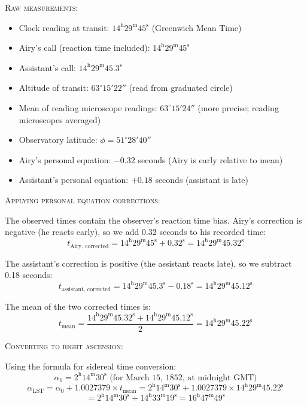 \textsc{Raw measurements:}
\begin{itemize}
  \item Clock reading at transit: $14^{\text{h}} 29^{\text{m}} 45^{\text{s}}$ (Greenwich Mean Time)
  \item Airy's call (reaction time included): $14^{\text{h}} 29^{\text{m}} 45^{\text{s}}$
  \item Assistant's call: $14^{\text{h}} 29^{\text{m}} 45.3^{\text{s}}$
  \item Altitude of transit: $63^{\circ} 15' 22''$ (read from graduated circle)
  \item Mean of reading microscope readings: $63^{\circ} 15' 24''$ (more precise; reading microscopes averaged)
  \item Observatory latitude: $\phi = 51^{\circ} 28' 40''$
  \item Airy's personal equation: $-0.32$ seconds (Airy is early relative to mean)
  \item Assistant's personal equation: $+0.18$ seconds (assistant is late)
\end{itemize}

\textsc{Applying personal equation corrections:}

The observed times contain the observer's reaction time bias. Airy's correction is negative (he reacts early), so we add 0.32 seconds to his recorded time:
\[
  t_{\text{Airy, corrected}} = 14^{\text{h}} 29^{\text{m}} 45^{\text{s}} + 0.32^{\text{s}} = 14^{\text{h}} 29^{\text{m}} 45.32^{\text{s}}
\]

The assistant's correction is positive (the assistant reacts late), so we subtract 0.18 seconds:
\[
  t_{\text{assistant, corrected}} = 14^{\text{h}} 29^{\text{m}} 45.3^{\text{s}} - 0.18^{\text{s}} = 14^{\text{h}} 29^{\text{m}} 45.12^{\text{s}}
\]

The mean of the two corrected times is:
\[
  t_{\text{mean}} = \frac{14^{\text{h}} 29^{\text{m}} 45.32^{\text{s}} + 14^{\text{h}} 29^{\text{m}} 45.12^{\text{s}}}{2} = 14^{\text{h}} 29^{\text{m}} 45.22^{\text{s}}
\]

\textsc{Converting to right ascension:}

Using the formula for sidereal time conversion:
\[
  \alpha_0 = 2^{\text{h}} 14^{\text{m}} 30^{\text{s}} \text{ (for March 15, 1852, at midnight GMT)}
\]
\[
  \alpha_{\text{LST}} = \alpha_0 + 1.0027379 \times t_{\text{mean}} = 2^{\text{h}} 14^{\text{m}} 30^{\text{s}} + 1.0027379 \times 14^{\text{h}} 29^{\text{m}} 45.22^{\text{s}}
\]
\[
  = 2^{\text{h}} 14^{\text{m}} 30^{\text{s}} + 14^{\text{h}} 33^{\text{m}} 19^{\text{s}} = 16^{\text{h}} 47^{\text{m}} 49^{\text{s}}
\]

